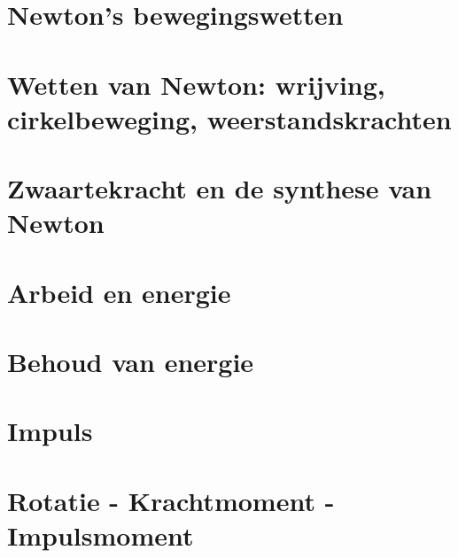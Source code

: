 \section{Newton's bewegingswetten}

\vspace{0.5cm}



\newpage

\section{Wetten van Newton: wrijving, cirkelbeweging, weerstandskrachten}

\vspace{0.5cm}



\newpage

\section{Zwaartekracht en de synthese van Newton}

\vspace{0.5cm}



\newpage

\section{Arbeid en energie}

\vspace{0.5cm}



\newpage

\section{Behoud van energie}

\vspace{0.5cm}



\newpage

\section{Impuls}

\vspace{0.5cm}



\newpage

\section{Rotatie - Krachtmoment - Impulsmoment}

\vspace{0.5cm}

